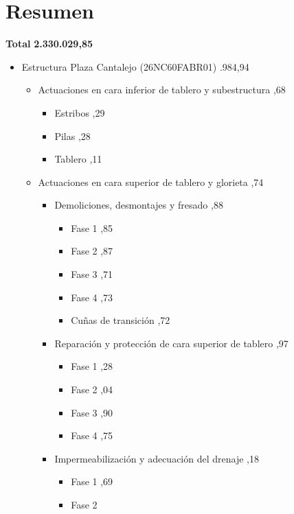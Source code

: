 \documentclass{book}%
\begin{document}
\chapter*{Resumen}%
\label{sec:Resumen}%
\Large%
\textbf{Total}%
\dotfill%
\textbf{2.330.029,85}%
\normalsize%
\begin{itemize}%
\item%
Estructura Plaza Cantalejo (26NC60FABR01)%
.984,94%
\begin{itemize}%
\item%
Actuaciones en cara inferior de tablero y subestructura%
,68%
\begin{itemize}%
\item%
Estribos%
,29%
\item%
Pilas%
,28%
\item%
Tablero%
,11%
\end{itemize}%
\item%
Actuaciones en cara superior de tablero y glorieta%
,74%
\begin{itemize}%
\item%
Demoliciones, desmontajes y fresado%
,88%
\begin{itemize}%
\item%
Fase 1%
,85%
\item%
Fase 2%
,87%
\item%
Fase 3%
,71%
\item%
Fase 4%
,73%
\item%
Cuñas de transición%
,72%
\end{itemize}%
\item%
Reparación y protección de cara superior de tablero%
,97%
\begin{itemize}%
\item%
Fase 1%
,28%
\item%
Fase 2%
,04%
\item%
Fase 3%
,90%
\item%
Fase 4%
,75%
\end{itemize}%
\item%
Impermeabilización y adecuación del drenaje%
,18%
\begin{itemize}%
\item%
Fase 1%
,69%
\item%
Fase 2%
\dotfill%

\end{itemize}
\end{itemize}
\end{itemize}
\end{itemize}
\end{document}
